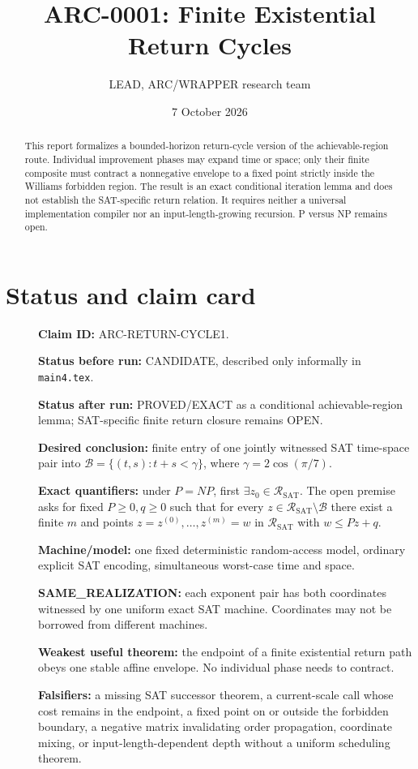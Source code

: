 \documentclass[11pt]{article}
\title{ARC-0001: Finite Existential Return Cycles}
\author{LEAD, ARC/WRAPPER research team}
\date{7 October 2026}
\newcommand{\SAT}{\mathrm{SAT}}
\newcommand{\R}{\mathcal R_{\SAT}}
\newcommand{\B}{\mathcal B}
\begin{document}
\maketitle

\begin{abstract}
This report formalizes a bounded-horizon return-cycle version of the
achievable-region route. Individual improvement phases may expand time or
space; only their finite composite must contract a nonnegative envelope to a
fixed point strictly inside the Williams forbidden region. The result is an
exact conditional iteration lemma and does not establish the SAT-specific
return relation. It requires neither a universal implementation compiler nor
an input-length-growing recursion. P versus NP remains open.
\end{abstract}

\section{Status and claim card}
\begin{description}
\item[] \textbf{Claim ID:} ARC-RETURN-CYCLE1.
\item[] \textbf{Status before run:} CANDIDATE, described only informally in
\texttt{main4.tex}.
\item[] \textbf{Status after run:} PROVED/EXACT as a conditional
achievable-region lemma; SAT-specific finite return closure remains OPEN.
\item[] \textbf{Desired conclusion:} finite entry of one jointly witnessed
SAT time-space pair into
$\B=\{(t,s):t+s<\gamma\}$, where
$\gamma=2\cos(\pi/7)$.
\item[] \textbf{Exact quantifiers:} under $P=NP$, first
$\exists z_0\in\R$. The open premise asks for fixed $P\ge0,q\ge0$ such that
for every $z\in\R\setminus\B$ there exist a finite $m$ and points
$z=z^{(0)},\ldots,z^{(m)}=w$ in $\R$ with $w\le Pz+q$.
\item[] \textbf{Machine/model:} one fixed deterministic random-access model,
ordinary explicit SAT encoding, simultaneous worst-case time and space.
\item[] \textbf{SAME\_REALIZATION:} each exponent pair has both coordinates
witnessed by one uniform exact SAT machine. Coordinates may not be borrowed
from different machines.
\item[] \textbf{Weakest useful theorem:} the endpoint of a finite existential
return path obeys one stable affine envelope. No individual phase needs to
contract.
\item[] \textbf{Falsifiers:} a missing SAT successor theorem, a current-scale
call whose cost remains in the endpoint, a fixed point on or outside the
forbidden boundary, a negative matrix invalidating order propagation,
coordinate mixing, or input-length-dependent depth without a uniform
scheduling theorem.
\end{description}
\end{document}
